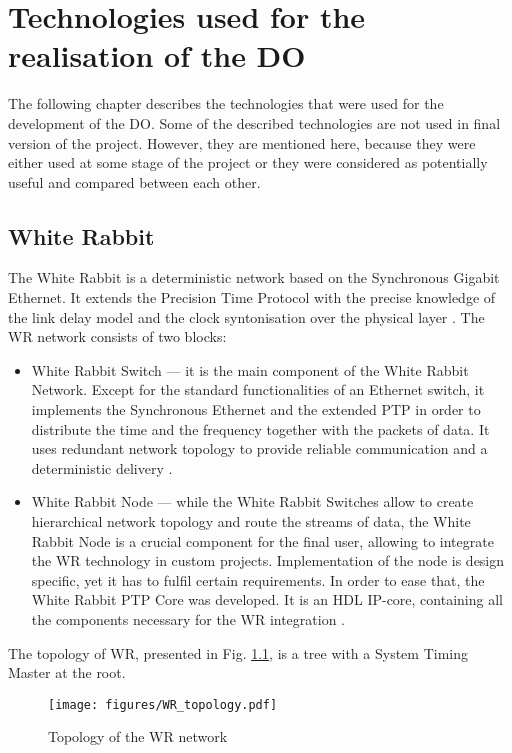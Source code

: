 \chapter{Technologies used for the realisation of the DO}

The following chapter describes the technologies that were used for the development of the DO. Some of the described technologies are not used in final version of the project. However, they are mentioned here, because they were either used at some stage of the project or they were considered as potentially useful and compared between each other.

\section{White Rabbit} \label{section:WR}
    The White Rabbit is a deterministic network based on the Synchronous Gigabit Ethernet. It extends the Precision
    Time Protocol with the precise knowledge of the link delay model and the clock syntonisation over the physical
    layer \cite{wr_master}.
    The WR network consists of two blocks:
    \begin{itemize}
        \item White Rabbit Switch --- it is the main component of the White Rabbit Network. Except for the standard functionalities of an Ethernet switch, it implements the Synchronous Ethernet and the extended PTP in order to distribute the time and the frequency together with the packets of data. It uses redundant network topology to provide reliable communication and a deterministic delivery \cite{wrs}. 
        \item White Rabbit Node --- while the White Rabbit Switches allow to create hierarchical network topology and route the streams of data, the White Rabbit Node is a crucial component for the final user, allowing to integrate the WR technology in custom projects. Implementation of the node is design specific, yet it has to fulfil certain requirements. In order to ease that, the White Rabbit PTP Core was developed. It is an HDL IP-core, containing all the components necessary for the WR integration \cite{ptp_master}.
    
    \end{itemize}
    The topology of WR, presented in Fig. \ref{fig:wr_topology}, is a tree with a System Timing Master at the root. 
    
    \begin{figure}
    	\centerline{\texttt{[image: figures/WR\_topology.pdf]}}
    	\caption{Topology of the WR network}
    	\label{fig:wr_topology}
    \end{figure}
    
